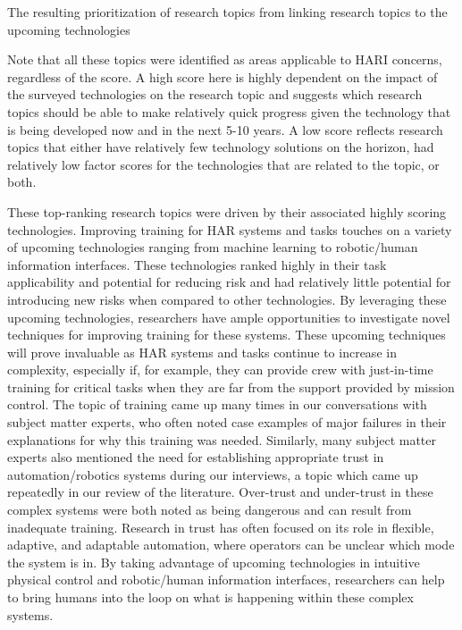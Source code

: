 \begin{table}[tb]
    \centering
    \caption{The resulting prioritization of research topics from linking research topics to the upcoming technologies}
    \label{table:topic-prioritization}
\end{table}

Note that all these topics were identified as areas applicable to HARI concerns, regardless of the score.
A high score here is highly dependent on the impact of the surveyed technologies on the research topic and suggests which research topics should be able to make relatively quick progress given the technology that is being developed now and in the next 5-10 years.
A low score reflects research topics that either have relatively few technology solutions on the horizon, had relatively low factor scores for the technologies that are related to the topic, or both.

These top-ranking research topics were driven by their associated highly scoring technologies.
Improving training for HAR systems and tasks touches on a variety of upcoming technologies ranging from machine learning to robotic/human information interfaces.
These technologies ranked highly in their task applicability and potential for reducing risk and had relatively little potential for introducing new risks when compared to other technologies.
By leveraging these upcoming technologies, researchers have ample opportunities to investigate novel techniques for improving training for these systems.
These upcoming techniques will prove invaluable as HAR systems and tasks continue to increase in complexity, especially if, for example, they can provide crew with just-in-time training for critical tasks when they are far from the support provided by mission control.
The topic of training came up many times in our conversations with subject matter experts, who often noted case examples of major failures in their explanations for why this training was needed.
Similarly, many subject matter experts also mentioned the need for establishing appropriate trust in automation/robotics systems during our interviews, a topic which came up repeatedly in our review of the literature.
Over-trust and under-trust in these complex systems were both noted as being dangerous and can result from inadequate training.
Research in trust has often focused on its role in flexible, adaptive, and adaptable automation, where operators can be unclear which mode the system is in.
By taking advantage of upcoming technologies in intuitive physical control and robotic/human information interfaces, researchers can help to bring humans into the loop on what is happening within these complex systems.

